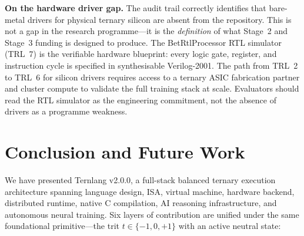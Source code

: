 \documentclass[11pt,a4paper]{article}
\begin{document}
\noindent\textbf{On the hardware driver gap.}
The audit trail correctly identifies that bare-metal drivers for physical
ternary silicon are absent from the repository. This is not a gap in the
research programme---it is the \emph{definition} of what Stage~2 and
Stage~3 funding is designed to produce. The BetRtlProcessor RTL simulator
(TRL~7) is the verifiable hardware blueprint: every logic gate, register,
and instruction cycle is specified in synthesisable Verilog-2001.
The path from TRL~2 to TRL~6 for silicon drivers requires access to a
ternary ASIC fabrication partner and cluster compute to validate the
full training stack at scale. Evaluators should read the RTL simulator
as the engineering commitment, not the absence of drivers as a programme weakness.

\section{Conclusion and Future Work}
\label{sec:conclusion}

We have presented Ternlang v2.0.0, a
full-stack balanced ternary execution architecture spanning language design, ISA,
virtual machine, hardware backend, distributed runtime, native C compilation, AI
reasoning infrastructure, and autonomous neural training. Six layers of
contribution are unified under the same foundational primitive---the
trit $t \in \{-1, 0, +1\}$ with an active neutral state:
\end{document}
